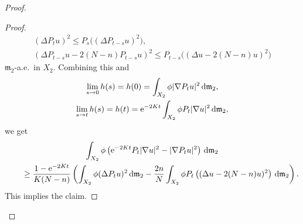 \documentclass[10pt,a4paper]{amsart}
\numberwithin{equation}{section}
\theoremstyle{definition}
\newcommand{\mf}{\mathfrak{m}}
\begin{document}
\begin{proof}
\begin{proof}
\begin{gather*}
 (\Delta P_{t} u)^2\leq P_{s}\big((\Delta P_{t-s} u)^2\big),
 \\
 (\Delta P_{t-s} u-2(N-n)P_{t-s} u)^2\leq P_{t-s} \big( (\Delta u-2(N-n)u)^2\big)
\end{gather*}
$\mf_2$-a.e.\ in $X_2$. Combining this and
\begin{gather*}
\lim_{s\to 0} h(s)=h(0)=\int_{X_2}\phi |\nabla P_t u|^2\,{\rm d}\mf_2,
\\
\lim_{s\to t} h(s)=h(t)={\rm e}^{-2K t}\int_{X_2}\phi P_t |\nabla u|^2\,{\rm d}\mf_2,
\end{gather*}
we get
\begin{gather*}
\int_{X_2}\phi \left({\rm e}^{-2K t} P_t |\nabla u|^2-|\nabla P_t u|^2\right)\,{\rm d}\mf_2
\\ \qquad
{}\geq \frac{1-{\rm e}^{-2 K t}}{K(N-n)}\left(\int_{X_2}\phi (\Delta P_{t} u)^2\,{\rm d}\mf_2
-\frac{2n}{N}\int_{X_2} \phi P_t\left( (\Delta u-2(N-n)u)^2\right)\,{\rm d}\mf_2 \right) .
\end{gather*}
This implies the claim.
\end{proof}


\end{proof}
\end{document}
